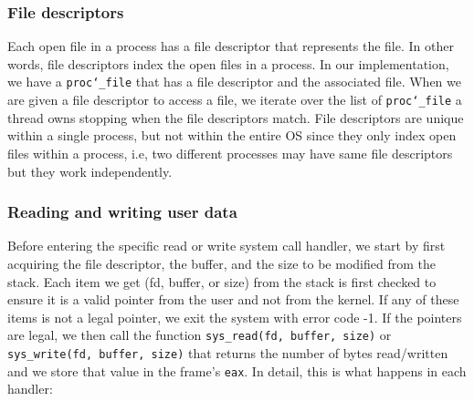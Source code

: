 \documentclass{article}
\renewcommand{\_}{\char`_}
\begin{document}
\subsubsection{File descriptors}
Each open file in a process has a file descriptor that represents the file. In other words, file descriptors index the open files in a process. In our implementation, we have a \texttt{proc\_file} that has a file descriptor and the associated file. When we are given a file descriptor to access a file, we iterate over the list of \texttt{proc\_file} a thread owns stopping when the file descriptors match.
File descriptors are unique within a single process, but not within the entire OS since they only index open files within a process, i.e, two different processes may have same file descriptors but they work independently.

\subsubsection{Reading and writing user data}

Before entering the specific read or write system call handler, we start by first acquiring the file descriptor, the buffer, and the size to be modified from the stack. Each item we get (fd, buffer, or size) from the stack is first checked to ensure it is a valid pointer from the user and not from the kernel. If any of these items is not a legal pointer, we exit the system with error code -1.  If the pointers are legal, we then call the function \lstinline{sys_read(fd, buffer, size)} or \lstinline{sys_write(fd, buffer, size)} that returns the number of bytes read/written and we store that value in the frame's \texttt{eax}. In detail, this is what happens in each handler:
\end{document}
